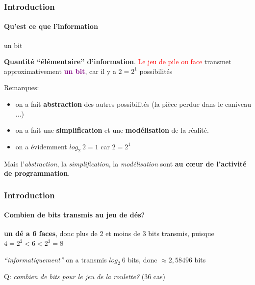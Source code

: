 \documentclass[xcolor=svgnames,final,smaller,a4]{beamer}
\begin{document}
\begin{frame}
  \frametitle{Introduction}
  \framesubtitle{Qu'est ce que l'information}

  \begin{block}{un bit}

    \textbf{Quantité ``élémentaire'' d'information}. \textcolor{red}{Le jeu de pile ou face} transmet approximativement \textcolor{purple}{\textbf{un bit}}, car il y a $2 = 2^1$ possibilités
    
  \end{block}

  Remarques:
  \begin{itemize}
  \item on a fait \textbf{abstraction} des autres possibilités (la pièce perdue dans le caniveau ...)
  \item on a fait une \textbf{simplification} et une \textbf{modélisation} de la réalité.
    \item on a évidemment $log_2 ~ 2 = 1$ car $2 = 2^1$
  \end{itemize}

  Mais l'\emph{abstraction}, la \emph{simplification}, la \emph{modélisation} sont \textbf{au c{\oe}ur de l'activité de programmation}.
  
\end{frame}

\begin{frame}
  \frametitle{Introduction}
  \framesubtitle{Combien de bits transmis au jeu de dés?}
  
  \textbf{un dé a 6 faces}, donc plus de 2 et moins de 3 bits transmis, puisque
  $4 = 2^2 < 6 < 2^3 = 8$

  \vspace{1cm}

  \emph{``informatiquement''} on a transmis $log_2~ 6$ bits, donc $\approx 2,58496$ bits

  \vspace{1cm}

  Q: \textit{combien de bits pour le jeu de la roulette?} (36 cas)
  
\end{frame}
\end{document}
